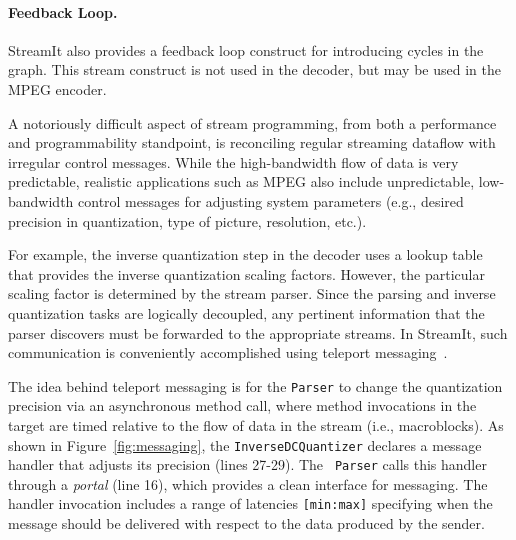 
\paragraph{Feedback Loop.}
StreamIt also provides a feedback loop construct for introducing
cycles in the graph. This stream construct is not used in the decoder,
but may be used in the MPEG encoder.

\label{sec:messaging}
A notoriously difficult aspect of stream programming, from both a
performance and programmability standpoint, is reconciling regular
streaming dataflow with irregular control messages.  While the
high-bandwidth flow of data is very predictable, realistic
applications such as MPEG also include unpredictable, low-bandwidth
control messages for adjusting system parameters (e.g., desired
precision in quantization, type of picture, resolution, etc.).

For example, the inverse quantization step in the decoder uses a
lookup table that provides the inverse quantization scaling factors.
However, the particular scaling factor is determined by the stream
parser. Since the parsing and inverse quantization tasks are logically
decoupled, any pertinent information that the parser discovers must be
forwarded to the appropriate streams.  In StreamIt, such
communication is conveniently accomplished using teleport
messaging~\cite{thies05ppopp}.

The idea behind teleport messaging is for the {\tt Parser} to change
the quantization precision via an asynchronous method call, where
method invocations in the target are timed relative to the flow of
data in the stream (i.e., macroblocks). As shown in
Figure~\ref{fig:messaging}, the {\tt InverseDCQuantizer} declares a
message handler that adjusts its precision (lines 27-29). The {\tt
Parser} calls this handler through a {\it portal} (line 16), which
provides a clean interface for messaging.  The handler invocation
includes a range of latencies {\tt [min:max]} specifying when the
message should be delivered with respect to the data produced by the
sender.

